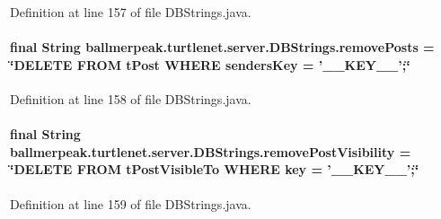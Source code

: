 Definition at line 157 of file D\-B\-Strings.\-java.

\hypertarget{classballmerpeak_1_1turtlenet_1_1server_1_1DBStrings_a558a3b46958bfa577aecc36b4f2c7b2f}{
\paragraph[{remove\-Posts}]{\setlength{\rightskip}{0pt plus 5cm}final String ballmerpeak.\-turtlenet.\-server.\-D\-B\-Strings.\-remove\-Posts = \char`\"{}D\-E\-L\-E\-T\-E F\-R\-O\-M t\-Post W\-H\-E\-R\-E senders\-Key = '\-\_\-\-\_\-\-K\-E\-Y\-\_\-\-\_\-';\char`\"{}\hspace{0.3cm}{\ttfamily [static]}}}\label{classballmerpeak_1_1turtlenet_1_1server_1_1DBStrings_a558a3b46958bfa577aecc36b4f2c7b2f}


Definition at line 158 of file D\-B\-Strings.\-java.

\hypertarget{classballmerpeak_1_1turtlenet_1_1server_1_1DBStrings_a2541bcdbb1f43144be6a70b42199b0d2}{
\paragraph[{remove\-Post\-Visibility}]{\setlength{\rightskip}{0pt plus 5cm}final String ballmerpeak.\-turtlenet.\-server.\-D\-B\-Strings.\-remove\-Post\-Visibility = \char`\"{}D\-E\-L\-E\-T\-E F\-R\-O\-M t\-Post\-Visible\-To W\-H\-E\-R\-E key = '\-\_\-\-\_\-\-K\-E\-Y\-\_\-\-\_\-';\char`\"{}\hspace{0.3cm}{\ttfamily [static]}}}\label{classballmerpeak_1_1turtlenet_1_1server_1_1DBStrings_a2541bcdbb1f43144be6a70b42199b0d2}


Definition at line 159 of file D\-B\-Strings.\-java.

